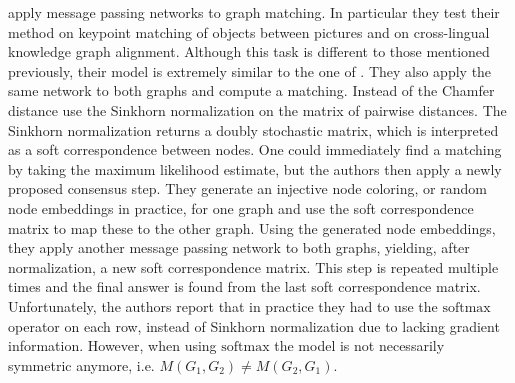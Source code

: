 \cite{fey2020_update} apply message passing networks to graph matching. In particular they test their method on keypoint matching of objects between pictures and on cross-lingual knowledge graph alignment. Although this task is different to those mentioned previously, their model is extremely similar to the one of \cite{riba2018}. They also apply the same network to both graphs and compute a matching. Instead of the Chamfer distance \cite{fey2020_update} use the Sinkhorn normalization \cite{sinkhorn2013} on the matrix of pairwise distances. The Sinkhorn normalization returns a doubly stochastic matrix, which is interpreted as a soft correspondence between nodes. One could immediately find a matching by taking the maximum likelihood estimate, but the authors then apply a newly proposed consensus step. They generate an injective node coloring, or random node embeddings in practice, for one graph and use the soft correspondence matrix to map these to the other graph. Using the generated node embeddings, they apply another message passing network to both graphs, yielding, after normalization, a new soft correspondence matrix. This step is repeated multiple times and the final answer is found from the last soft correspondence matrix. Unfortunately, the authors report that in practice they had to use the $\text{softmax}$ operator on each row, instead of Sinkhorn normalization due to lacking gradient information. However, when using $\text{softmax}$ the model is not necessarily symmetric anymore, i.e. $M(G_1, G_2) \neq M(G_2, G_1)$.







